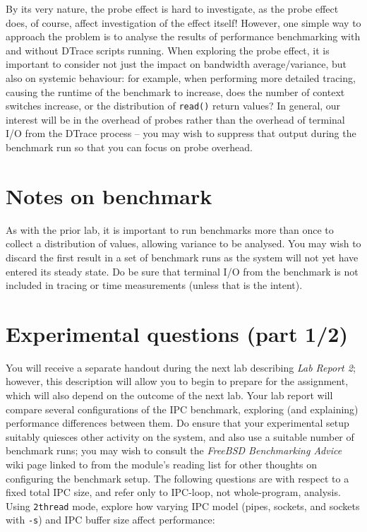 \documentclass[a4paper,10pt]{article}
\begin{document}
By its very nature, the probe effect is hard to investigate, as the probe
effect does, of course, affect investigation of the effect itself!
However, one simple way to approach the problem is to analyse the results of
performance benchmarking with and without DTrace scripts running.
When exploring the probe effect, it is important to consider not just the
impact on bandwidth average/variance, but also on systemic behaviour: for
example, when performing more detailed tracing, causing the runtime of the
benchmark to increase, does the number of context switches increase, or the
distribution of \texttt{read()} return values?
In general, our interest will be in the overhead of probes rather than the
overhead of terminal I/O from the DTrace process -- you may wish to suppress
that output during the benchmark run so that you can focus on probe overhead.

\section*{Notes on benchmark}

As with the prior lab, it is important to run benchmarks more than once to
collect a distribution of values, allowing variance to be analysed.
You may wish to discard the first result in a set of benchmark runs as the
system will not yet have entered its steady state.
Do be sure that terminal I/O from the benchmark is not included in tracing or
time measurements (unless that is the intent).

\section*{Experimental questions (part 1/2)}

You will receive a separate handout during the next lab describing \textit{Lab
Report 2}; however, this description will allow you to begin to prepare for
the assignment, which will also depend on the outcome of the next lab.
Your lab report will compare several configurations of the IPC benchmark,
exploring (and explaining) performance differences between them.
Do ensure that your experimental setup suitably quiesces other activity on the
system, and also use a suitable number of benchmark runs; you may wish to
consult the \textit{FreeBSD Benchmarking Advice} wiki page linked to from the
module's reading list for other thoughts on configuring the benchmark setup.
The following questions are with respect to a fixed total IPC size,
and refer only to IPC-loop, not
whole-program, analysis.
Using \texttt{2thread} mode, explore how varying IPC model (pipes, sockets,
and sockets with \texttt{-s}) and IPC buffer size affect
performance:
\end{document}
